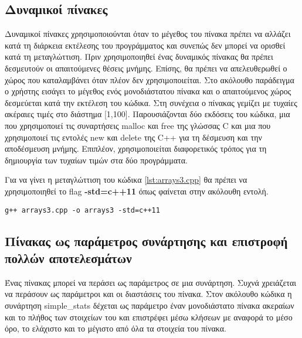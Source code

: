 \subsection{Δυναμικοί πίνακες}
Δυναμικοί πίνακες χρησιμοποιούνται όταν το μέγεθος του πίνακα πρέπει να αλλάζει κατά τη διάρκεια εκτέλεσης του προγράμματος και συνεπώς δεν μπορεί να ορισθεί κατά τη μεταγλώττιση. Πριν χρησιμοποιηθεί ένας δυναμικός πίνακας θα πρέπει δεσμευτούν οι απαιτούμενες θέσεις μνήμης. Επίσης, θα πρέπει να απελευθερωθεί ο χώρος που καταλαμβάνει όταν πλέον δεν χρησιμοποιείται. Στο ακόλουθο παράδειγμα ο χρήστης εισάγει το μέγεθος ενός μονοδιάστατου πίνακα και ο απαιτούμενος χώρος δεσμεύεται κατά την εκτέλεση του κώδικα. Στη συνέχεια ο πίνακας γεμίζει με τυχαίες ακέραιες τιμές στο διάστημα [1,100]. Παρουσιάζονται δύο εκδόσεις του κώδικα, μια που χρησιμοποιεί τις συναρτήσεις malloc και free της γλώσσας C και μια που χρησιμοποιεί τις εντολές new και delete της C++ για τη δέσμευση και την αποδέσμευση μνήμης. Επιπλέον, χρησιμοποιείται διαφορετικός τρόπος για τη δημιουργία των τυχαίων τιμών στα δύο προγράμματα.








Για να γίνει η μεταγλώττιση του κώδικα \ref{lst:arrays3.cpp} θα πρέπει να χρησιμοποιηθεί το flag \textbf{-std=c++11} όπως φαίνεται στην ακόλουθη εντολή.

\begin{lstlisting}[style=DOS]
g++ arrays3.cpp -o arrays3 -std=c++11
\end{lstlisting}

\subsection{Πίνακας ως παράμετρος συνάρτησης και επιστροφή πολλών αποτελεσμάτων}
Ένας πίνακας μπορεί να περάσει ως παράμετρος σε μια συνάρτηση. Συχνά χρειάζεται να περάσουν ως παράμετροι και οι διαστάσεις του πίνακα. Στον ακόλουθο κώδικα η συνάρτηση simple\_stats δέχεται ως παράμετρο έναν μονοδιάστατο  πίνακα ακεραίων και το πλήθος των στοιχείων του και επιστρέφει μέσω κλήσεων με αναφορά το μέσο όρο, το ελάχιστο και το μέγιστο από όλα τα στοιχεία του πίνακα.

